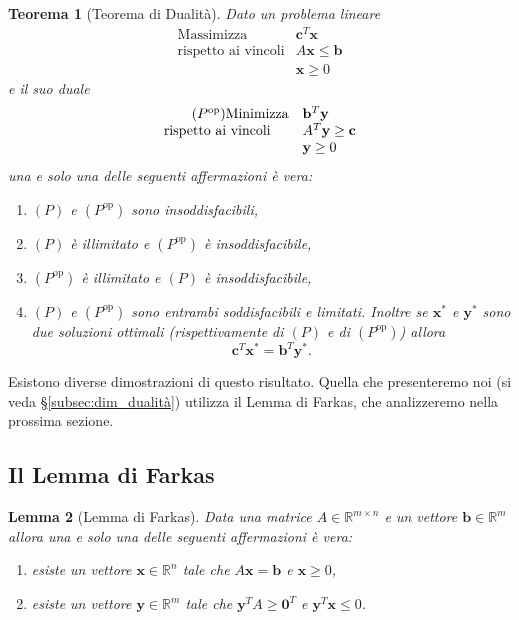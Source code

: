 \documentclass[italian, letter paper, 12pt, reqno]{article}
\theoremstyle{myteo}
\newtheorem{theorem}{Teorema}[section]
\newtheorem{lemma}[theorem]{Lemma}
\numberwithin{equation}{section}
\newcommand{\dual}[1]{#1^{\text{op}}}
\begin{document}
\begin{theorem}[Teorema di Dualità]
  \label{teo:dualità}
  Dato un problema lineare
  \begin{equation*}
    \begin{array}{ll}
      \tag{\(P\)}
      \text{Massimizza} & \mathbf{c}^T\mathbf{x}\\
      \text{rispetto ai vincoli} & A\mathbf{x} \leq \mathbf{b}\\
                        & \mathbf{x} \geq 0
    \end{array}
  \end{equation*}
  e il suo duale
  \begin{equation*}
    \begin{array}{ll}
      \tag{\(\dual{P}\)}
      \text{Minimizza} & \mathbf{b}^T\mathbf{y}\\
      \text{rispetto ai vincoli} & A^T\mathbf{y} \geq \mathbf{c}\\
                        & \mathbf{y} \geq 0
    \end{array}
  \end{equation*}
  una e solo una delle seguenti affermazioni è vera:
  \begin{enumerate}
  \item \((P)\) e \((\dual{P})\) sono insoddisfacibili,
  \item \((P)\) è illimitato e \((\dual{P})\) è insoddisfacibile,
  \item \((\dual{P})\) è illimitato e \((P)\) è insoddisfacibile,
  \item \((P)\) e \((\dual{P})\) sono entrambi soddisfacibili e limitati.
    Inoltre se \(\mathbf{x}^*\) e \(\mathbf{y}^*\) sono due soluzioni ottimali (rispettivamente di \((P)\) e di \((\dual{P})\)) allora
    \[\mathbf{c}^T\mathbf{x}^* = \mathbf{b}^T\mathbf{y}^*.\]
  \end{enumerate}
\end{theorem}

Esistono diverse dimostrazioni di questo risultato.
Quella che presenteremo noi (si veda \S\ref{subsec:dim_dualità}) utilizza il Lemma di Farkas, che analizzeremo nella prossima sezione.

\subsection{Il Lemma di Farkas}
\label{subsec:lemma_di_farkas}

\begin{lemma}[Lemma di Farkas]
  \label{lemma:farkas}
  Data una matrice \(A\in\mathbb{R}^{m\times n}\) e un vettore \(\mathbf{b}\in\mathbb{R}^m\) allora una e solo una delle seguenti affermazioni è vera:
  \begin{enumerate}
  \item esiste un vettore \(\mathbf{x}\in\mathbb{R}^n\) tale che \(A\mathbf{x}=\mathbf{b}\) e \(\mathbf{x} \geq 0\),
  \item esiste un vettore \(\mathbf{y}\in\mathbb{R}^m\) tale che \(\mathbf{y}^TA \geq \mathbf{0}^T\) e \(\mathbf{y}^T\mathbf{x} \leq 0\).
  \end{enumerate}
\end{lemma}
\end{document}
